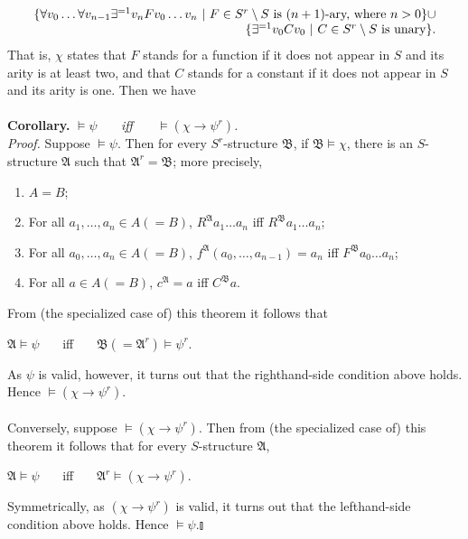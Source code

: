 \begin{enumerate}[1.]
\[
\begin{array}{r}
\{ \forall v_0 \ldots \forall v_{n - 1} \exists^{=1} v_n F v_0 \ldots v_n \ | \ \mbox{$F \in S^r \setminus S$ is $(n + 1)$-ary, where $n > 0$} \} \cup \cr
\{ \exists^{=1} v_0 C v_0 \ | \ \mbox{$C \in S^r \setminus S$ is unary} \}.
\end{array}
\]
That is, $\chi$ states that $F$ stands for a function if it does not appear in $S$ and its arity is at least two, and that $C$ stands for a constant if it does not appear in $S$ and its arity is one. Then we have\\
\ \\
\textbf{Corollary.} \hfill \emph{$\models \psi$ \ \ \ iff \ \ \ $\models (\chi \rightarrow \psi^r)$.} \hfill \phantom{Corollary.}\\
\textit{Proof.} Suppose $\models \psi$. Then for every $S^r$-structure $\mathfrak{B}$, if $\mathfrak{B} \models \chi$, there is an $S$-structure $\mathfrak{A}$ such that $\mathfrak{A}^r = \mathfrak{B}$; more precisely,
\begin{enumerate}[(1)]
\item $A = B$;
\item For all $a_1, \ldots, a_n \in A (= B)$, $R^\mathfrak{A} a_1 \ldots a_n$ iff $R^\mathfrak{B} a_1 \ldots a_n$;
\item For all $a_0, \ldots, a_n \in A (= B)$, $f^\mathfrak{A} (a_0, \ldots, a_{n - 1}) = a_n$ iff $F^\mathfrak{B} a_0 \ldots a_n$;
\item For all $a \in A (= B)$, $c^\mathfrak{A} = a$ iff $C^\mathfrak{B} a$.
\end{enumerate}
From (the specialized case of) this theorem it follows that
\begin{center}
$\mathfrak{A} \models \psi$ \ \ \ iff \ \ \ $\mathfrak{B} (= \mathfrak{A}^r) \models \psi^r$.
\end{center}
As $\psi$ is valid, however, it turns out that the righthand-side condition above holds. Hence $\models (\chi \rightarrow \psi^r)$.\\
\ \\
Conversely, suppose $\models (\chi \rightarrow \psi^r)$. Then from (the specialized case of) this theorem it follows that for every $S$-structure $\mathfrak{A}$,
\begin{center}
$\mathfrak{A} \models \psi$ \ \ \ iff \ \ \ $\mathfrak{A}^r \models (\chi \rightarrow \psi^r)$.
\end{center}
Symmetrically, as $(\chi \rightarrow \psi^r)$ is valid, it turns out that the lefthand-side condition above holds. Hence $\models \psi$.\nolinebreak\hfill$\talloblong$

\end{enumerate}

